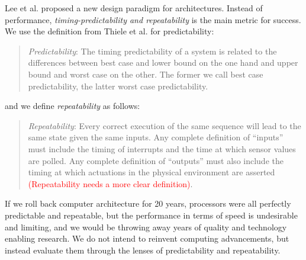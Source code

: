 Lee et al.\cite{Edwards2007PRETcase} proposed a new design paradigm
for architectures. Instead of performance,
\textit{timing-predictability and repeatability} is the main metric
for success. We use the definition from Thiele et
al.\cite{thiele_et_al:DSP:2004:2} for predictability:
\begin{quote}
  \textit{Predictability}: The timing predictability of a system is
  related to the differences between best case and lower bound on the
  one hand and upper bound and worst case on the other. The former we
  call best case predictability, the latter worst case
  predictability. 
\end{quote} and we define \textit{repeatability} as follows:
\begin{quote}
  \textit{Repeatability}: Every correct execution of the same sequence
  will lead to the same state given the same inputs. Any complete
  definition of ``inputs'' must include the timing of interrupts and
  the time at which sensor values are polled. Any complete definition
  of ``outputs'' must also include the timing at which actuations in the
  physical environment are asserted\cite{Edwards_adisruptive}
  \textcolor{red}{(Repeatability needs a more clear definition)}.
\end{quote} If we roll back computer architecture for 20 years,
processors were all perfectly predictable and repeatable, but the
performance in terms of speed is undesirable and limiting, and we
would be throwing away years of quality and technology enabling
research. We do not intend to reinvent computing advancements,
but instead evaluate them through the lenses of predictability and
repeatability.

